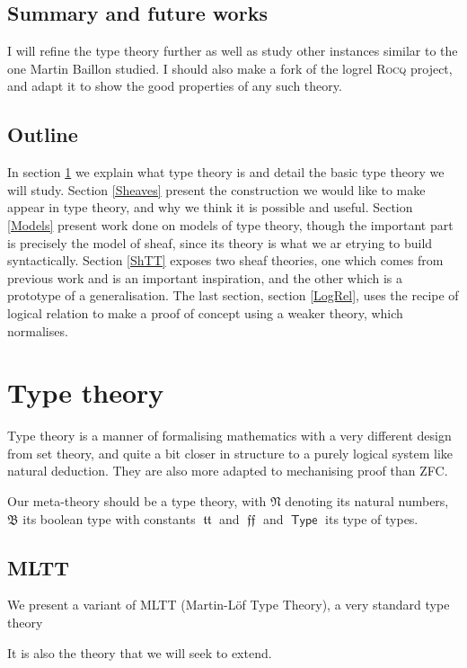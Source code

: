 \documentclass[11pt]{article}
\DeclareMathOperator{\Type}{\mathsf{Type}}
\DeclareMathOperator{\mtrue}{\mathfrak{tt}}
\DeclareMathOperator{\mfalse}{\mathfrak{ff}}
\newcommand{\0}{\mathbf{0}}
\newcommand{\1}{\mathbf{1}}
\newcommand{\mnat}{\mathfrak{N}}
\newcommand{\mbool}{\mathfrak{B}}
\begin{document}
\subsection*{Summary and future works}
I will refine the type theory further as well as study other instances similar to the one Martin Baillon studied.
I should also make a fork of the logrel \textsc{Rocq} project, and adapt it to show the good properties of any such theory.
\newpage
\tableofcontents
\newpage

\subsection*{Outline}

In section \ref{TT} we explain what type theory is and detail the basic type theory we will study. Section \ref{Sheaves} present the construction we would like to make appear in type theory, and why we think it is possible and useful. Section \ref{Models} present work done on models of type theory, though the important part is precisely the model of sheaf, since its theory is what we ar etrying to build syntactically. Section \ref{ShTT} exposes two sheaf theories, one which comes from previous work and is an important inspiration, and the other which is a prototype of a generalisation. The last section, section \ref{LogRel}, uses the recipe of logical relation to make a proof of concept using a weaker theory, which normalises.

\section{Type theory}\label{TT}

Type theory is a manner of formalising mathematics with a very different design from set theory, and quite a bit closer in structure to a purely logical system like natural deduction. They are also more adapted to mechanising proof than ZFC.

Our meta-theory should be a type theory, with $\mnat$ denoting its natural numbers, $\mbool$ its boolean type with constants $\mtrue$ and $\mfalse$ and $\Type$ its type of types.

\subsection{MLTT}
We present a variant of MLTT (Martin-Löf Type Theory), a very standard type theory

It is also the theory that we will seek to extend.
\end{document}
